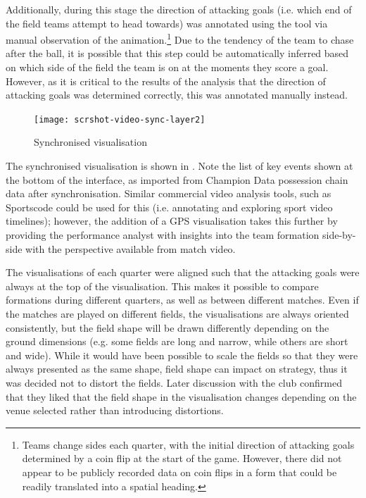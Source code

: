 Additionally, during this stage the direction of attacking goals (i.e. which end of the field teams attempt to head towards) was annotated using the tool via manual observation of the animation.\footnote{Teams change sides each quarter, with the initial direction of attacking goals determined by a coin flip at the start of the game. However, there did not appear to be publicly recorded data on coin flips in a form that could be readily translated into a spatial heading.} Due to the tendency of the team to chase after the ball, it is possible that this step could be automatically inferred based on which side of the field the team is on at the moments they score a goal. However, as it is critical to the results of the analysis that the direction of attacking goals was determined correctly, this was annotated manually instead.



\pagebreak{}

\begin{figure}[!htb]
  \centering
  \texttt{[image: scrshot-video-sync-layer2]}
  \caption{Synchronised visualisation}
  \label{fig:scrshot-video-sync-layer2}
\end{figure}

The synchronised visualisation is shown in . Note the list of key events shown at the bottom of the interface, as imported from Champion Data possession chain data after synchronisation. Similar commercial video analysis tools, such as Sportscode could be used for this (i.e. annotating and exploring sport video timelines); however, the addition of a GPS visualisation takes this further by providing the performance analyst with insights into the team formation side-by-side with the perspective available from match video.

The visualisations of each quarter were aligned such that the attacking goals were always at the top of the visualisation. This makes it possible to compare formations during different quarters, as well as between different matches. Even if the matches are played on different fields, the visualisations are always oriented consistently, but the field shape will be drawn differently depending on the ground dimensions (e.g. some fields are long and narrow, while others are short and wide). While it would have been possible to scale the fields so that they were always presented as the same shape, field shape can impact on strategy, thus it was decided not to distort the fields. Later discussion with the club confirmed that they liked that the field shape in the visualisation changes depending on the venue selected rather than introducing distortions.


